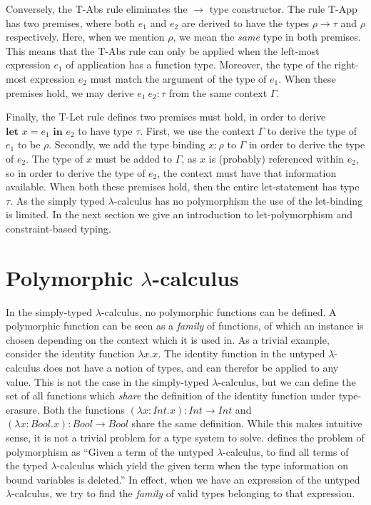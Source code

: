 Conversely, the T-Abs rule eliminates the $\rightarrow$ type constructor.
The rule T-App has two premises, where both $e_1$ and $e_2$ are derived to have the types $\rho \rightarrow \tau$ and $\rho$ respectively.
Here, when we mention $\rho$, we mean the \textit{same} type in both premises.
This means that the T-Abs rule can only be applied when the left-most expression $e_1$ of application has a function type.
Moreover, the type of the right-most expression $e_2$ must match the argument of the type of $e_1$.
When these premises hold, we may derive $e_1 \: e_2 : \tau$ from the same context $\Gamma$.

Finally, the T-Let rule defines two premises must hold, in order to derive $\textbf{let } x = e_1 \textbf{ in } e_2$ to have type $\tau$.
First, we use the context $\Gamma$ to derive the type of $e_1$ to be $\rho$.
Secondly, we add the type binding $x : \rho$ to $\Gamma$ in order to derive the type of $e_2$.
The type of $x$ must be added to $\Gamma$, as $x$ is (probably) referenced within $e_2$, so in order to derive the type of $e_2$, the context must have that information available.
When both these premises hold, then the entire let-statement has type $\tau$.
As the simply typed $\lambda$-calculus has no polymorphism the use of the let-binding is limited.
In the next section we give an introduction to let-polymorphism and constraint-based typing.

\section{Polymorphic $\lambda$-calculus} \label{sec:polymorphiclambda}
In the simply-typed $\lambda$-calculus, no polymorphic functions can be defined.
A polymorphic function can be seen as a \textit{family} of functions, of which an instance is chosen depending on the context which it is used in.
As a trivial example, consider the identity function $\lambda x.x$.
The identity function in the untyped $\lambda$-calculus does not have a notion of types, and can therefor be applied to any value.
This is not the case in the simply-typed $\lambda$-calculus, but we can define the set of all functions which \textit{share} the definition of the identity function under type-erasure.
Both the functions $(\lambda x : \textit{Int}. x) : \textit{Int} \to \textit{Int}$ and $(\lambda x : \textit{Bool}.x) : \textit{Bool} \to \textit{Bool}$ share the same definition.
While this makes intuitive sense, it is not a trivial problem for a type system to solve.
\citeauthor{wand1987simple} defines\cite{wand1987simple} the problem of polymorphism as ``Given a term of the untyped $\lambda$-calculus, to find all terms of the typed $\lambda$-calculus which yield the given term when the type information on bound variables is deleted.''
In effect, when we have an expression of the untyped $\lambda$-calculus, we try to find the \textit{family} of valid types belonging to that expression.

